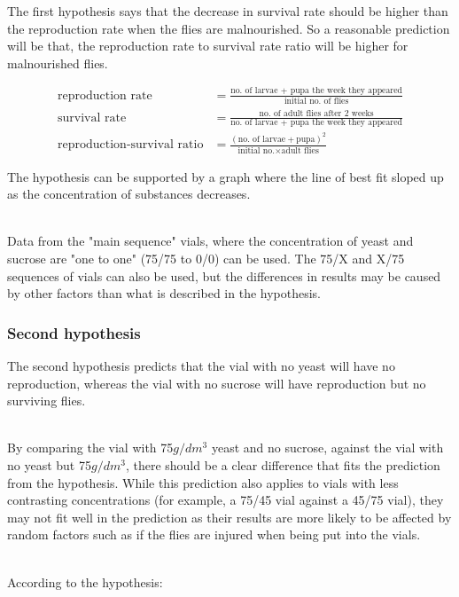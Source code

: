 \documentclass{article}
\begin{document}
The first hypothesis says that the decrease in survival rate should be higher than the reproduction rate when the flies are malnourished. So a reasonable prediction will be that, the reproduction rate to survival rate ratio will be higher for malnourished flies.

\begin{align*}
  \text{reproduction rate}&=\frac{\text{no. of larvae + pupa the week they appeared}}{\text{initial no. of flies}}\\
  \text{survival rate}&=\frac{\text{no. of adult flies after 2 weeks}}{\text{no. of larvae + pupa the week they appeared}}\\
  \text{reproduction-survival ratio}&=\frac{(\text{no. of larvae}+\text{pupa})^2}{\text{initial no.}\times\text{adult flies}}
\end{align*}

\noindent
The hypothesis can be supported by a graph where the line of best fit sloped up as the concentration of substances decreases.

\noindent\\
Data from the "main sequence" vials, where the concentration of yeast and sucrose are "one to one" (75/75 to 0/0) can be used. The 75/X and X/75 sequences of vials can also be used, but the differences in results may be caused by other factors than what is described in the hypothesis.

\subsubsection{Second hypothesis}

The second hypothesis predicts that the vial with no yeast will have no reproduction, whereas the vial with no sucrose will have reproduction but no surviving flies.

\noindent\\
By comparing the vial with 75$g/dm^3$ yeast and no sucrose, against the vial with no yeast but 75$g/dm^3$, there should be a clear difference that fits the prediction from the hypothesis. While this prediction also applies to vials with less contrasting concentrations (for example, a 75/45 vial against a 45/75 vial), they may not fit well in the prediction as their results are more likely to be affected by random factors such as if the flies are injured when being put into the vials.

\noindent\\
According to the hypothesis:
\end{document}
